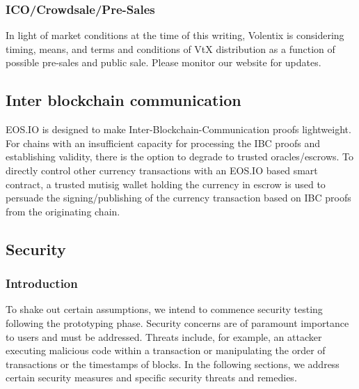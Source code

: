 \documentclass[]{article}
\begin{document}
{\begin{enumerate}
\end{enumerate}

\subsubsection {ICO/Crowdsale/Pre-Sales}

In light of market conditions at the time of this writing, Volentix is considering timing, means, and terms and conditions of VtX distribution as a function of possible pre-sales and public sale. Please monitor our website for updates. 


\subsection{Inter blockchain communication}
EOS.IO is designed to make Inter-Blockchain-Communication proofs lightweight. 
For chains with an insufficient capacity for processing the  IBC proofs and establishing validity, 
there is the option to degrade to trusted oracles/escrows.
To directly control other currency transactions with an
EOS.IO based smart contract, a trusted mutisig wallet holding the currency 
in escrow is used to persuade the signing/publishing of the currency 
transaction based on IBC proofs from the originating chain.	


\subsection{Security}
\subsubsection{Introduction}
To shake out certain assumptions, we intend to commence security testing following the prototyping phase.
Security concerns are of paramount importance to users and must be addressed. 
Threats include, for example, an attacker executing malicious code within a transaction or manipulating 
the order of transactions or the timestamps of blocks. In the following sections, 
 we address certain security measures and specific security threats and remedies. 
}
\end{document}

